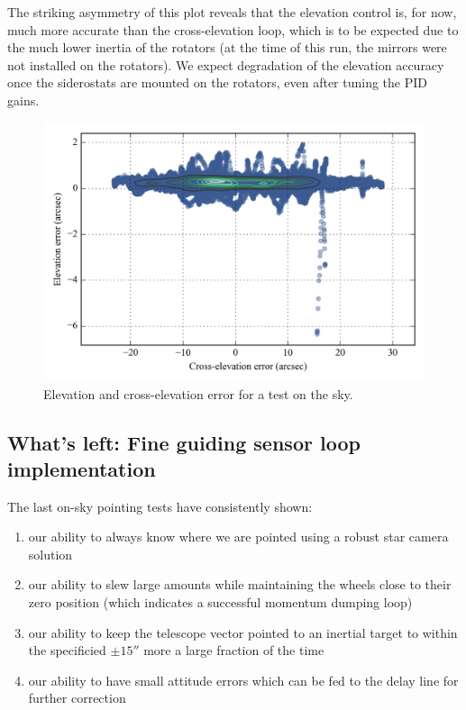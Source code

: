 The striking asymmetry of this plot reveals that the elevation control is, for now, much more accurate than the cross-elevation loop, which is to be expected due to the much lower inertia of the rotators (at the time of this run, the mirrors were not installed on the rotators). We expect degradation of the elevation accuracy once the siderostats are mounted on the rotators, even after tuning the PID gains.

\begin{figure}[!h]
\begin{center}
\includegraphics{Figures/simple2DPlot_crossEl_elevation.png}
\vspace{-0.5cm}
\caption[Elevation and cross-elevation error]{Elevation and cross-elevation error for a test on the sky.}
\label{fig:simple2DPlot_crossEl_elevation}
\end{center}
\end{figure}




\subsection{What's left: Fine guiding sensor loop implementation}

The last on-sky pointing tests have consistently shown:
\begin{enumerate}
\item our ability to always know where we are pointed using a robust star camera solution
\item our ability to slew large amounts while maintaining the wheels close to their zero position (which indicates a successful momentum dumping loop)
\item our ability to keep the telescope vector pointed to an inertial target to within the specificied $\pm\ang{;;15}$ more a large fraction of the time
\item our ability to have small attitude errors which can be fed to the delay line for further correction
\end{enumerate}

